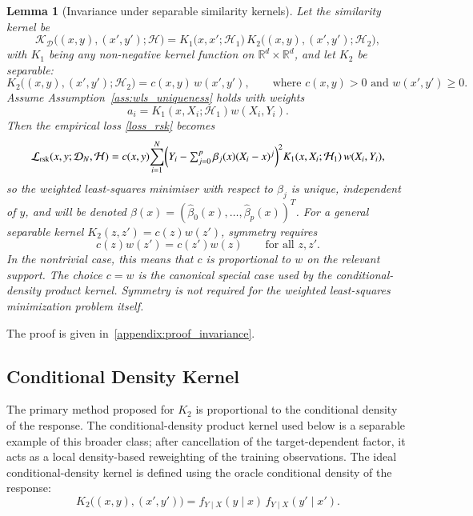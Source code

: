 \documentclass[preprint,1p,times,authoryear]{elsarticle}
\newtheorem{lemma}{Lemma}
\begin{document}
\begin{lemma}[Invariance under separable similarity kernels]
\label{lemma:invariance}
Let the similarity kernel be
\[
\mathcal{K}_{\mathcal{D}}\!\bigl((x,y),(x',y');\mathcal{H}\bigr)
= K_1\!\bigl(x,x';\mathcal{H}_1\bigr)\,
K_2\!\bigl((x,y),(x',y');\mathcal{H}_2\bigr),
\]
with $K_1$ being any non-negative kernel function on $\mathbb{R}^d \times \mathbb{R}^d$, and let $K_2$ be separable:
\[
K_2\!\bigl((x,y),(x',y');\mathcal{H}_2\bigr)
= c(x,y)\,w(x',y'),
\qquad \text{where } c(x,y)>0 \text{ and } w(x',y')\ge 0.
\]
Assume Assumption~\ref{ass:wls_uniqueness} holds with weights
\[
a_i=K_1(x,X_i;\mathcal{H}_1)w(X_i,Y_i).
\]
Then the empirical loss \eqref{loss_rsk} becomes
\[
\mathcal{L}_{\text{rsk}}(x,y;\mathcal{D}_N,\mathcal{H})
= c(x,y)\!\sum_{i=1}^{N}
\Bigl(Y_i-\textstyle\sum_{j=0}^{p}\beta_j(x)(X_i - x)^j\Bigr)^2
K_1(x,X_i;\mathcal{H}_1)\,w(X_i,Y_i),
\]
so the weighted least-squares minimiser with respect to $\beta_j$ is unique, independent of $y$, and will be denoted $\hat\beta(x) = (\hat\beta_0(x), \dots, \hat\beta_p(x))^T$. For a general separable kernel \(K_2(z,z')=c(z)w(z')\), symmetry requires
\[
c(z)w(z')=c(z')w(z)
\qquad \text{for all } z,z'.
\]
In the nontrivial case, this means that \(c\) is proportional to \(w\) on the relevant support. The choice \(c=w\) is the canonical special case used by the conditional-density product kernel. Symmetry is not required for the weighted least-squares minimization problem itself.
\end{lemma}
The proof is given in~\ref{appendix:proof_invariance}.

\subsection*{Conditional Density Kernel}
The primary method proposed for $K_2$ is proportional to the conditional density of the response.
The conditional-density product kernel used below is a separable example of this broader class; after cancellation of the target-dependent factor, it acts as a local density-based reweighting of the training observations.
The ideal conditional-density kernel is defined using the oracle conditional density of the response:
\[
K_2\!\bigl((x,y),(x',y')\bigr)
=
f_{Y\mid X}(y\mid x)\,
f_{Y\mid X}(y'\mid x').
\]
\end{document}

